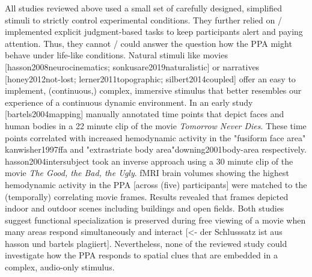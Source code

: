 \documentclass[english]{article}
\begin{document}
All studies reviewed above used a small set of carefully designed, simplified stimuli to strictly control experimental conditions. They further relied on / implemented explicit judgment-based tasks to keep participants alert and paying attention. Thus, they cannot / could answer the question how the PPA might behave under life-like conditions. Natural stimuli like movies [hasson2008neurocinematics; sonkusare2019naturalistic] or narratives [honey2012not-lost; lerner2011topographic; silbert2014coupled] offer an easy to implement, (continuous,) complex, immersive stimulus that better resembles our experience of a continuous dynamic environment. 
In an early study [bartels2004mapping] manually annotated time points that depict faces and human bodies in a 22 minute clip of the movie \textit{Tomorrow Never Dies}. These time points correlated with increased hemodynamic activity in the "fusiform face area" {kanwisher1997ffa} and "extrastriate body area"{downing2001body-area} respectively. 
{hasson2004intersubject} took an inverse approach using a 30 minute clip of the movie \textit{The Good, the Bad, the Ugly}. fMRI brain volumes showing the highest hemodynamic activity in the PPA [across (five) participants] were matched to the (temporally) correlating movie frames. Results revealed that frames depicted indoor and outdoor scenes including buildings and open fields. 
Both studies suggest functional specialization is preserved during free viewing of a movie when many areas respond simultaneously and interact [<- der Schlusssatz ist aus hasson und bartels plagiiert]. Nevertheless, none of the reviewed study could investigate how the PPA responds to spatial clues that are embedded in a complex, audio-only stimulus.
\end{document}
